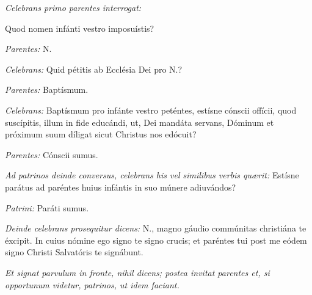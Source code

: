 \textit{Celebrans primo parentes interrogat:}

Quod nomen infánti vestro imposuístis?

\textit{Parentes:} {\color{red}N.}

\textit{Celebrans:} Quid pétitis ab Ecclésia Dei pro {\color{red}N.}?

\textit{Parentes:} Baptísmum.

\textit{Celebrans:} Baptísmum pro infánte vestro peténtes,
estísne cónscii offícii, quod suscípitis, illum in fide educándi, ut, Dei
mandáta servans, Dóminum et próximum suum díligat sicut Christus nos
edócuit?

\textit{Parentes:} Cónscii sumus.

\textit{Ad patrinos deinde conversus, celebrans his vel similibus
verbis quærit:} Estísne parátus ad paréntes huius infántis in suo múnere
adiuvándos?

\textit{Patrini:} Paráti sumus.

\textit{Deinde celebrans prosequitur dicens:} {\color{red}N.}, magno gáudio commúnitas
christiána te éxcipit. In cuius nómine ego signo te signo crucis; et paréntes
tui post me eódem signo Christi Salvatóris te signábunt.

\textit{Et signat parvulum in fronte, nihil dicens; postea
invitat parentes et, si opportunum videtur, patrinos, ut idem faciant.}
